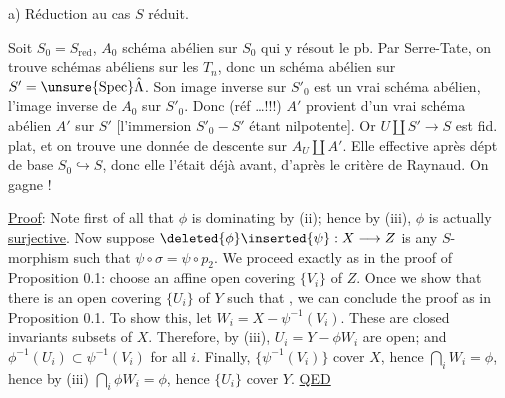 a) Réduction au cas $S$ réduit.

Soit $S_0=S_{\mathrm{red}}$, $A_0$ schéma abélien sur $S_0$ qui y résout le pb. Par Serre-Tate, on trouve  schémas abéliens sur les $T_n$, donc un schéma  abélien  sur $S'=\unsure{\operatorname{Spec}}\hat\Lambda$. Son image inverse sur $S'_0$ est un vrai schéma abélien,   l'image inverse de $A_0$ sur $S'_0$. Donc (réf \dots !!!) $A'$ provient d'un vrai schéma abélien $A'$ sur $S'$ [l'immersion $S'_0\mathbin{-}S'$ étant nilpotente]. Or $U\amalg S'\to S$ est fid. plat, et on trouve une donnée de descente sur $A_U\amalg A'$. Elle  effective après dépt de base $S_0\hookrightarrow S$, donc elle l'était déjà avant, d'après le critère de Raynaud. On gagne !


\uline{Proof}: Note first of all that $\phi$ is dominating by (ii); hence by (iii), $\phi$ is actually \uline{surjective}. Now suppose $\deleted{\phi}\inserted{\psi}:X\longrightarrow Z$ is any $S$-morphism such that $\psi\circ\sigma=\psi\circ p_2$. We proceed exactly as in the proof of Proposition 0.1: choose an affine open covering $\{V_i\}$ of $Z$. Once we show that there is an open covering $\{U_i\}$ of $Y$ such that
,
we can conclude the proof as in Proposition 0.1. To show this, let $W_i=X-\psi^{-1}(V_i)$. These are closed invariants subsets of $X$. Therefore, by (iii), $U_i=Y-\phi W_i$ are open; and $\phi^{-1}(U_i)\subset\psi^{-1}(V_i)$ for all $i$. Finally, $\{\psi^{-1}(V_i)\}$ cover $X$, hence $\bigcap_iW_i=\phi$, hence by (iii) $\bigcap_i\phi W_i=\phi$, hence $\{U_i\}$ cover $Y$. \uline{QED}

